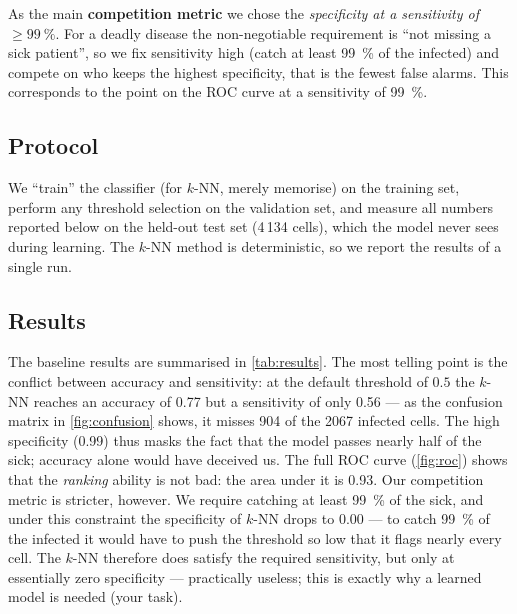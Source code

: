 \documentclass[11pt]{article}
\makeatletter
\newcommand{\Ntest}{4\,134}
\newcommand{\knnAcc}{0.77}      %
\newcommand{\knnSens}{0.56}     %
\newcommand{\knnSpec}{0.99}     %
\newcommand{\knnFN}{904}        %
\newcommand{\knnSpecNF}{0.00}   %
\newcommand{\knnAUC}{0.93}
\makeatother
\begin{document}
As the main \textbf{competition metric} we chose the \emph{specificity at a sensitivity of
$\geq 99~\%$}. For a deadly disease the non-negotiable requirement is ``not missing a sick
patient'', so we fix sensitivity high (catch at least 99~\% of the infected) and compete on who
keeps the highest specificity, that is the fewest false alarms. This corresponds to the point on
the ROC curve at a sensitivity of 99~\%.

\subsection{Protocol}
\label{sec:protocol}

We ``train'' the classifier (for $k$-NN, merely memorise) on the training set, perform any
threshold selection on the validation set, and measure all numbers reported below on the
held-out test set (\Ntest{} cells), which the model never sees during learning. The $k$-NN
method is deterministic, so we report the results of a single run.

\subsection{Results}
\label{sec:results}

The baseline results are summarised in \cref{tab:results}. The most telling point is the
conflict between accuracy and sensitivity: at the default threshold of $0.5$ the $k$-NN reaches
an accuracy of \knnAcc{} but a sensitivity of only \knnSens{} --- as the confusion matrix in
\cref{fig:confusion} shows, it misses \knnFN{} of the 2067 infected cells. The high specificity
(\knnSpec{}) thus masks the fact that the model passes nearly half of the sick; accuracy alone
would have deceived us. The full ROC curve (\cref{fig:roc}) shows that the \emph{ranking} ability
is not bad: the area under it is \knnAUC{}. Our competition metric is stricter, however. We
require catching at least 99~\% of the sick, and under this constraint the specificity of $k$-NN
drops to \knnSpecNF{} --- to catch 99~\% of the infected it would have to push the threshold so
low that it flags nearly every cell. The $k$-NN therefore does satisfy the required sensitivity,
but only at essentially zero specificity --- practically useless; this is exactly why a learned
model is needed (your task).
\end{document}
